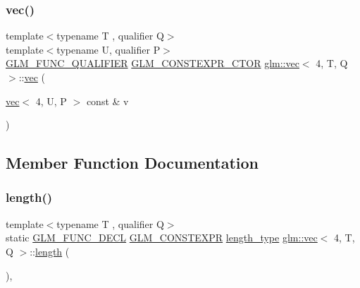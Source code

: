 \mbox{\label{structglm_1_1vec_3_014_00_01_t_00_01_q_01_4_a057f137a7b9cd18c6277dd4bc7f90335}} 
\subsubsection{\texorpdfstring{vec()}{vec()}\hspace{0.1cm}{\footnotesize\ttfamily [34/34]}}
{\footnotesize\ttfamily template$<$typename T , qualifier Q$>$ \\
template$<$typename U, qualifier P$>$ \\
\mbox{\hyperlink{setup_8hpp_a33fdea6f91c5f834105f7415e2a64407}{G\+L\+M\+\_\+\+F\+U\+N\+C\+\_\+\+Q\+U\+A\+L\+I\+F\+I\+ER}} \mbox{\hyperlink{setup_8hpp_ad34178a09666081abdb573c14d1f4a5a}{G\+L\+M\+\_\+\+C\+O\+N\+S\+T\+E\+X\+P\+R\+\_\+\+C\+T\+OR}} \mbox{\hyperlink{structglm_1_1vec}{glm\+::vec}}$<$ 4, T, Q $>$\+::\mbox{\hyperlink{structglm_1_1vec}{vec}} (\begin{DoxyParamCaption}\item[{\mbox{\hyperlink{structglm_1_1vec}{vec}}$<$ 4, U, P $>$ const \&}]{v }\end{DoxyParamCaption})}



\subsection{Member Function Documentation}
\mbox{\label{structglm_1_1vec_3_014_00_01_t_00_01_q_01_4_ac83fdb652378185c944b11f5cf35744d}} 
\subsubsection{\texorpdfstring{length()}{length()}}
{\footnotesize\ttfamily template$<$typename T , qualifier Q$>$ \\
static \mbox{\hyperlink{setup_8hpp_ab2d052de21a70539923e9bcbf6e83a51}{G\+L\+M\+\_\+\+F\+U\+N\+C\+\_\+\+D\+E\+CL}} \mbox{\hyperlink{setup_8hpp_a08b807947b47031d3a511f03f89645ad}{G\+L\+M\+\_\+\+C\+O\+N\+S\+T\+E\+X\+PR}} \mbox{\hyperlink{structglm_1_1vec_3_014_00_01_t_00_01_q_01_4_af1c8f56963141951f4a4724b47e072d9}{length\+\_\+type}} \mbox{\hyperlink{structglm_1_1vec}{glm\+::vec}}$<$ 4, T, Q $>$\+::\mbox{\hyperlink{_s_d_l__opengl__glext_8h_ab9c919755bde3b34349e23a32b4e0fa7}{length}} (\begin{DoxyParamCaption}{ }\end{DoxyParamCaption})\hspace{0.3cm}{\ttfamily [inline]}, {\ttfamily [static]}}

